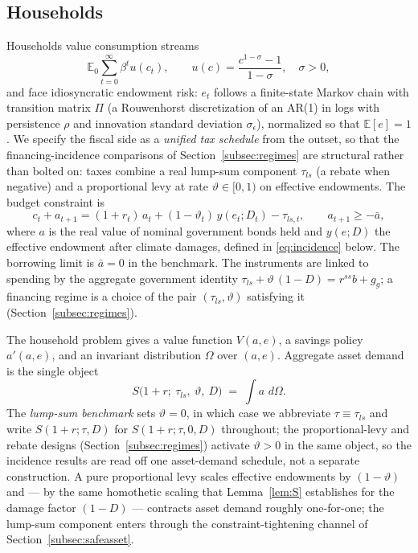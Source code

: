 \documentclass[12pt]{article}
\newcommand{\E}{\mathbb{E}}
\newcommand{\Sfun}{S}
\newcommand{\dd}{\,d}
\begin{document}
\subsection{Households}\label{subsec:households}

Households value consumption streams
\begin{equation}
\E_0 \sum_{t=0}^{\infty}\beta^t u(c_t), \qquad
u(c)=\frac{c^{1-\sigma}-1}{1-\sigma},\quad \sigma>0,
\label{eq:preferences}
\end{equation}
and face idiosyncratic endowment risk: $e_t$ follows a finite-state Markov
chain with transition matrix $\Pi$ (a Rouwenhorst discretization of an AR(1)
in logs with persistence $\rho$ and innovation standard deviation
$\sigma_\epsilon$), normalized so that $\E[e]=1$. We specify the fiscal side as
a \emph{unified tax schedule} from the outset, so that the financing-incidence
comparisons of Section~\ref{subsec:regimes} are structural rather than bolted
on: taxes combine a real lump-sum component $\tau_{ls}$ (a rebate when
negative) and a proportional levy at rate $\vartheta\in[0,1)$ on effective
endowments. The
budget constraint is
\begin{equation}
c_t + a_{t+1} = (1+r_t)\,a_t + (1-\vartheta_t)\,y(e_t; D_t) - \tau_{ls,t},
\qquad a_{t+1}\ge -\bar a,
\label{eq:budget}
\end{equation}
where $a$ is the real value of nominal government bonds held and $y(e;D)$ the
effective endowment after climate damages, defined in
\eqref{eq:incidence} below. The borrowing limit is $\bar a = 0$ in the
benchmark. The instruments are linked to spending by the aggregate government
identity $\tau_{ls}+\vartheta\,(1-D)=r^{ss}b+g_g$; a financing regime is a
choice of the pair $(\tau_{ls},\vartheta)$ satisfying it (Section~\ref{subsec:regimes}).

The household problem gives a value function $V(a,e)$, a savings policy
$a'(a,e)$, and an invariant distribution $\Omega$ over $(a,e)$. Aggregate
asset demand is the single object
\begin{equation}
\Sfun\big(1+r;\ \tau_{ls},\ \vartheta,\ D\big) \;=\; \int a \,\dd\Omega .
\label{eq:Sdef}
\end{equation}
The \emph{lump-sum benchmark} sets $\vartheta=0$, in which case we abbreviate
$\tau\equiv\tau_{ls}$ and write $\Sfun(1+r;\tau,D)$ for
$\Sfun(1+r;\tau,0,D)$ throughout; the proportional-levy and rebate designs
(Section~\ref{subsec:regimes}) activate $\vartheta>0$ in the same object,
so the incidence results are read off one asset-demand schedule, not a separate
construction. A pure proportional levy scales effective endowments by
$(1-\vartheta)$ and --- by the same homothetic scaling that
Lemma~\ref{lem:S} establishes for the damage factor $(1-D)$ --- contracts asset
demand roughly one-for-one; the lump-sum component enters through the
constraint-tightening channel of Section~\ref{subsec:safeasset}.
\end{document}
